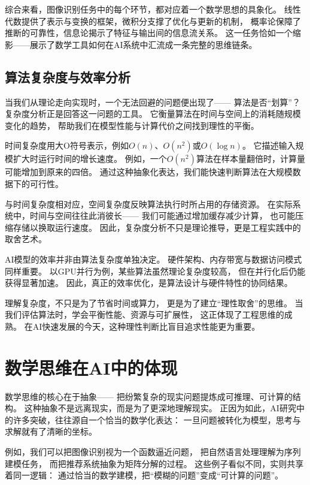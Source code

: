 综合来看，图像识别任务中的每个环节，都对应着一个数学思想的具象化。  
线性代数提供了表示与变换的框架，微积分支撑了优化与更新的机制，  
概率论保障了推断的可靠性，信息论揭示了特征与输出间的信息流关系。  
这一任务恰如一个缩影——展示了数学工具如何在AI系统中汇流成一条完整的思维链条。

\subsection{算法复杂度与效率分析}

当我们从理论走向实现时，一个无法回避的问题便出现了——  
算法是否“划算”？  
复杂度分析正是回答这一问题的工具。  
它衡量算法在时间与空间上的消耗随规模变化的趋势，  
帮助我们在模型性能与计算代价之间找到理性的平衡。

时间复杂度用大O符号表示，例如$O(n)$、$O(n^2)$或$O(\log n)$。  
它描述输入规模扩大时运行时间的增长速度。  
例如，一个$O(n^2)$算法在样本量翻倍时，计算量可能增加到原来的四倍。  
通过这种抽象化表达，我们能快速判断算法在大规模数据下的可行性。

与时间复杂度相对应，空间复杂度反映算法执行时所占用的存储资源。  
在实际系统中，时间与空间往往此消彼长——  
我们可能通过增加缓存减少计算，  
也可能压缩存储以换取运行速度。  
因此，复杂度分析不只是理论推导，更是工程实践中的取舍艺术。

AI模型的效率并非由算法复杂度单独决定。  
硬件架构、内存带宽与数据访问模式同样重要。  
以GPU并行为例，某些算法虽然理论复杂度较高，  
但在并行化后仍能获得显著加速。  
因此，真正的效率优化，是算法设计与硬件特性的协同结果。

理解复杂度，不只是为了节省时间或算力，  
更是为了建立“理性取舍”的思维。  
当我们评估算法时，学会平衡性能、资源与可扩展性，  
这正体现了工程思维的成熟。  
在AI快速发展的今天，这种理性判断比盲目追求性能更为重要。

\section{数学思维在AI中的体现}

数学思维的核心在于抽象——  
把纷繁复杂的现实问题提炼成可推理、可计算的结构。  
这种抽象不是远离现实，而是为了更深地理解现实。  
正因为如此，AI研究中的许多突破，往往源自一个恰当的数学化表达：  
一旦问题被转化为模型，思考与求解就有了清晰的坐标。

例如，我们可以把图像识别视为一个函数逼近问题，  
把自然语言处理理解为序列建模任务，  
而把推荐系统抽象为矩阵分解的过程。  
这些例子看似不同，实则共享着同一逻辑：  
通过恰当的数学建模，把“模糊的问题”变成“可计算的问题”。

